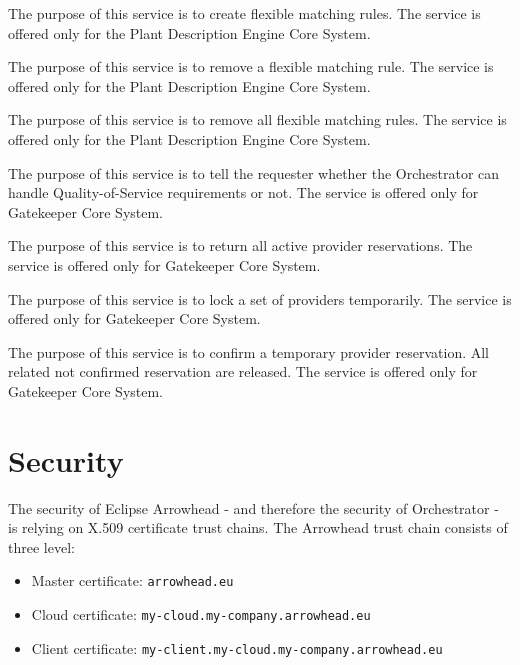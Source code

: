 \documentclass[a4paper]{arrowhead}
\begin{document}
The purpose of this service is to create flexible matching rules. The service is offered only for the Plant Description Engine Core System.

The purpose of this service is to remove a flexible matching rule. The service is offered only for the Plant Description Engine Core System.

The purpose of this service is to remove all flexible matching rules. The service is offered only for the Plant Description Engine Core System.

The purpose of this service is to tell the requester whether the Orchestrator can handle Quality-of-Service requirements or not. The service is offered only for Gatekeeper Core System.

The purpose of this service is to return all active provider reservations. The service is offered only for Gatekeeper Core System. 

The purpose of this service is to lock a set of providers temporarily. The service is offered only for Gatekeeper Core System. 

The purpose of this service is to confirm a temporary provider reservation. All related not confirmed reservation are released. The service is offered only for Gatekeeper Core System. 

\newpage

\section{Security}
\label{sec:security}

The security of Eclipse Arrowhead - and therefore the security of Orchestrator  - is relying on X.509 certificate trust chains. The Arrowhead trust chain consists of three level:
\begin{itemize}
    \item Master certificate: \texttt{arrowhead.eu}
    \item Cloud certificate: \texttt {my-cloud.my-company.arrowhead.eu}
    \item Client certificate: \texttt{my-client.my-cloud.my-company.arrowhead.eu}
\end{itemize}
\end{document}
